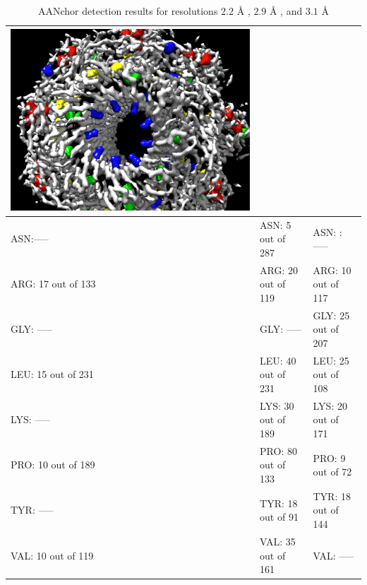 \begin{table}
\begin{tabular}{|m{4cm}|m{4cm}|m{4cm}|}
      \includegraphics[scale = 0.14]{pics/lys_pore_GLY_LEU_LYS_TYR.png} \\
      \hline
      \color{black} ASN:----- 
      &
      \color{black} ASN: 5 out of 287 
      &
      \color{black} ASN: :-----   \\
      
      \color{black} ARG: 17 out of 133 
      &
      \color{black} ARG: 20 out of 119 
      &
      \color{black} ARG: 10 out of 117  \\

      \color{yellow} GLY: ----- 
      &
      \color{yellow} GLY: ----- 
      &
      \color{yellow} GLY: 25 out of 207  \\
      
      \color{red} LEU: 15 out of 231 
      &
      \color{red} LEU: 40 out of 231 
      &
      \color{red} LEU: 25 out of 108  \\
      
      \color{blue} LYS: ----- 
      &
      \color{blue} LYS: 30 out of 189 
      &
      \color{blue} LYS: 20 out of 171  \\

      \color{magenta} PRO: 10 out of 189 
      &
      \color{magenta} PRO: 80 out of 133 
      &
      \color{magenta} PRO: 9 out of 72  \\

      \color{green} TYR: ----- 
      &
      \color{green} TYR: 18 out of 91 
      &
      \color{green} TYR: 18 out of 144  \\

      \color{orange} VAL: 10 out of 119 
      &
      \color{orange} VAL: 35 out of 161 
      &
      \color{orange} VAL: -----  \\

      \hline

\end{tabular}
\caption{AANchor detection results for resolutions $2.2$ {\AA}  , $2.9$ {\AA} , and $3.1$ {\AA} } \label{t31}
\vspace{-3mm}
\end{table}

